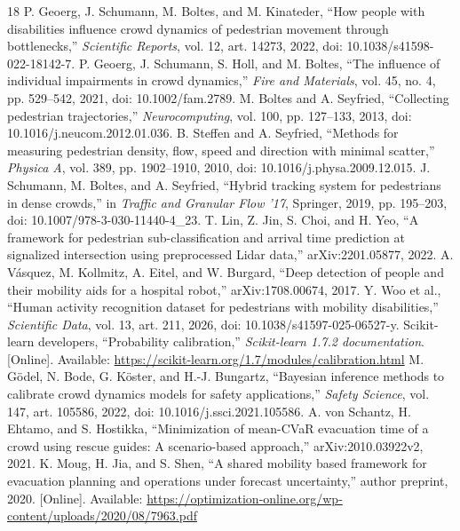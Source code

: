 \documentclass[conference]{IEEEtran}
\begin{document}
\begin{thebibliography}{18}
 P. Geoerg, J. Schumann, M. Boltes, and M. Kinateder, ``How people with disabilities influence crowd dynamics of pedestrian movement through bottlenecks,'' \emph{Scientific Reports}, vol. 12, art. 14273, 2022, doi: 10.1038/s41598-022-18142-7.
 P. Geoerg, J. Schumann, S. Holl, and M. Boltes, ``The influence of individual impairments in crowd dynamics,'' \emph{Fire and Materials}, vol. 45, no. 4, pp. 529--542, 2021, doi: 10.1002/fam.2789.
 M. Boltes and A. Seyfried, ``Collecting pedestrian trajectories,'' \emph{Neurocomputing}, vol. 100, pp. 127--133, 2013, doi: 10.1016/j.neucom.2012.01.036.
 B. Steffen and A. Seyfried, ``Methods for measuring pedestrian density, flow, speed and direction with minimal scatter,'' \emph{Physica A}, vol. 389, pp. 1902--1910, 2010, doi: 10.1016/j.physa.2009.12.015.
 J. Schumann, M. Boltes, and A. Seyfried, ``Hybrid tracking system for pedestrians in dense crowds,'' in \emph{Traffic and Granular Flow '17}, Springer, 2019, pp. 195--203, doi: 10.1007/978-3-030-11440-4\_23.
 T. Lin, Z. Jin, S. Choi, and H. Yeo, ``A framework for pedestrian sub-classification and arrival time prediction at signalized intersection using preprocessed Lidar data,'' arXiv:2201.05877, 2022.
 A. V\'{a}squez, M. Kollmitz, A. Eitel, and W. Burgard, ``Deep detection of people and their mobility aids for a hospital robot,'' arXiv:1708.00674, 2017.
 Y. Woo et al., ``Human activity recognition dataset for pedestrians with mobility disabilities,'' \emph{Scientific Data}, vol. 13, art. 211, 2026, doi: 10.1038/s41597-025-06527-y.
 Scikit-learn developers, ``Probability calibration,'' \emph{Scikit-learn 1.7.2 documentation}. [Online]. Available: \url{https://scikit-learn.org/1.7/modules/calibration.html}
 M. G\"odel, N. Bode, G. K\"oster, and H.-J. Bungartz, ``Bayesian inference methods to calibrate crowd dynamics models for safety applications,'' \emph{Safety Science}, vol. 147, art. 105586, 2022, doi: 10.1016/j.ssci.2021.105586.
 A. von Schantz, H. Ehtamo, and S. Hostikka, ``Minimization of mean-CVaR evacuation time of a crowd using rescue guides: A scenario-based approach,'' arXiv:2010.03922v2, 2021.
 K. Moug, H. Jia, and S. Shen, ``A shared mobility based framework for evacuation planning and operations under forecast uncertainty,'' author preprint, 2020. [Online]. Available: \url{https://optimization-online.org/wp-content/uploads/2020/08/7963.pdf}

\end{thebibliography}
\end{document}
